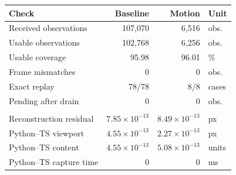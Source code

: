 \begin{tabularx}{\columnwidth}{@{}Yrrl@{}}
\toprule
\textbf{Check} & \textbf{Baseline} & \textbf{Motion} & \textbf{Unit} \\
\midrule
Received observations & 107,070 & 6,516 & obs. \\
Usable observations & 102,768 & 6,256 & obs. \\
Usable coverage & 95.98 & 96.01 & \% \\
Frame mismatches & 0 & 0 & obs. \\
Exact replay & 78/78 & 8/8 & cases \\
Pending after drain & 0 & 0 & obs. \\
\addlinespace[3pt]
 \\
\addlinespace[2pt]
Reconstruction residual & $7.85\times10^{-13}$ & $8.49\times10^{-13}$ & px \\
Python--TS viewport & $4.55\times10^{-13}$ & $2.27\times10^{-13}$ & px \\
Python--TS content & $4.55\times10^{-13}$ & $5.08\times10^{-13}$ & units \\
Python--TS capture time & 0 & 0 & ms \\
\bottomrule
\end{tabularx}
